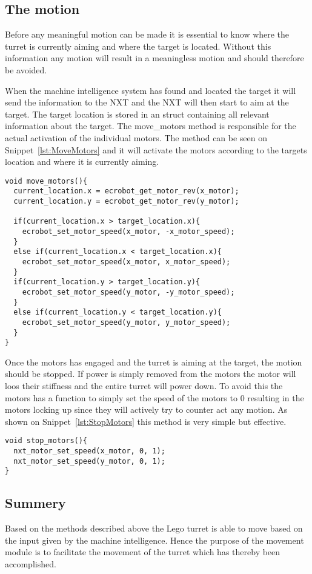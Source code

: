 \subsection{The motion}
Before any meaningful motion can be made it is essential to know where the turret is currently aiming and where the target is located. 
Without this information any motion will result in a meaningless motion and should therefore be avoided. 

When the machine intelligence system has found and located the target it will send the information to the NXT and the NXT will then start to aim at the target. 
The target location is stored in an struct containing all relevant information about the target. 
The move\_motors method is responsible for the actual activation of the individual motors.
The method can be seen on Snippet~\ref{lst:MoveMotors} and it will activate the motors according to the targets location and where it is currently aiming. 
\begin{lstlisting}[language=CSharp,caption={move\_motors method from movement.c},label={lst:MoveMotors}]
void move_motors(){
  current_location.x = ecrobot_get_motor_rev(x_motor);
  current_location.y = ecrobot_get_motor_rev(y_motor);

  if(current_location.x > target_location.x){
    ecrobot_set_motor_speed(x_motor, -x_motor_speed);
  }
  else if(current_location.x < target_location.x){
    ecrobot_set_motor_speed(x_motor, x_motor_speed);
  }
  if(current_location.y > target_location.y){
    ecrobot_set_motor_speed(y_motor, -y_motor_speed);
  }
  else if(current_location.y < target_location.y){
    ecrobot_set_motor_speed(y_motor, y_motor_speed);
  }
}
\end{lstlisting}
Once the motors has engaged and the turret is aiming at the target, the motion should be stopped. 
If power is simply removed from the motors the motor will loos their stiffness and the entire turret will power down. 
To avoid this the motors has a function to simply set the speed of the motors to $0$ resulting in the motors locking up since they will actively try to counter act any motion. 
As shown on Snippet~\ref{lst:StopMotors} this method is very simple but effective. 
\begin{lstlisting}[language=CSharp,label={lst:StopMotors},caption={stop\_motors method from movement.c}]
void stop_motors(){
  nxt_motor_set_speed(x_motor, 0, 1);
  nxt_motor_set_speed(y_motor, 0, 1);
}
\end{lstlisting}

\subsection{Summery}
Based on the methods described above the Lego turret is able to move based on the input given by the machine intelligence. 
Hence the purpose of the movement module is to facilitate the movement of the turret which has thereby been accomplished. 